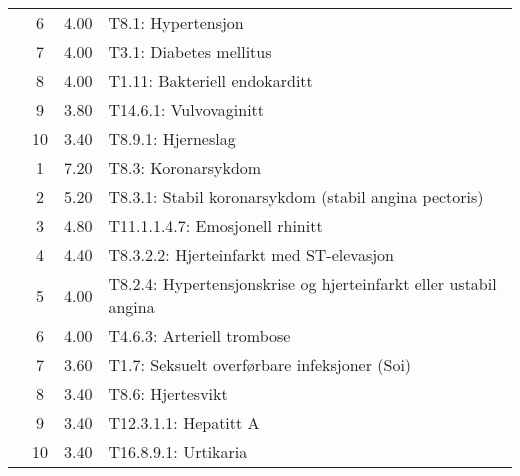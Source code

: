 \begin{table}[htbp]
\begin{tabular}{c c c l}
     & 6 & 4.00 & T8.1: Hypertensjon \\
     & 7 & 4.00 & T3.1: Diabetes mellitus \\
     & 8 & 4.00 & T1.11: Bakteriell endokarditt \\
     & 9 & 3.80 & T14.6.1: Vulvovaginitt \\
     & 10 & 3.40 & T8.9.1: Hjerneslag \\
	\addlinespace
    4 & 1 & 7.20 & T8.3: Koronarsykdom \\
     & 2 & 5.20 & T8.3.1: Stabil koronarsykdom (stabil angina pectoris) \\
     & 3 & 4.80 & T11.1.1.4.7: Emosjonell rhinitt \\
     & 4 & 4.40 & T8.3.2.2: Hjerteinfarkt med ST-elevasjon \\
     & 5 & 4.00 & T8.2.4: Hypertensjonskrise og hjerteinfarkt eller ustabil angina \\
     & 6 & 4.00 & T4.6.3: Arteriell trombose \\
     & 7 & 3.60 & T1.7: Seksuelt overførbare infeksjoner (Soi) \\
     & 8 & 3.40 & T8.6: Hjertesvikt \\
     & 9 & 3.40 & T12.3.1.1: Hepatitt A \\
     & 10 & 3.40 & T16.8.9.1: Urtikaria \\
	\bottomrule
\end{tabular}
\end{table}

